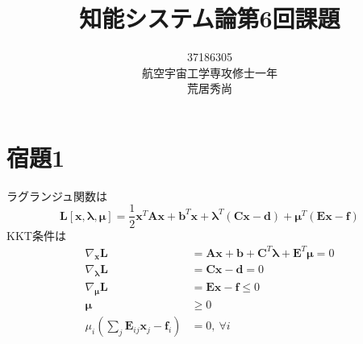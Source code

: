 \documentclass[10pt,a4paper]{ltjsarticle}       %
\title{知能システム論第6回課題}
\author{37186305\\航空宇宙工学専攻修士一年\\荒居秀尚}
\begin{document}
    \maketitle
    \section{宿題1}
    ラグランジュ関数は
    \begin{equation}
    \bm{L}[\bm{x}, \bm{\lambda}, \bm{\mu}] = \frac{1}{2}\bm{x}^T \bm{A}\bm{x} + \bm{b}^T\bm{x} + \bm{\lambda}^T(\bm{Cx} - \bm{d}) + \bm{\mu}^T(\bm{Ex} - \bm{f})
    \end{equation}
    KKT条件は
    \begin{align}
    \nabla_{\bm{x}} \bm{L} &= \bm{Ax} + \bm{b} + \bm{C}^T\bm{\lambda} + \bm{E}^T\bm{\mu} = 0\\
    \nabla_{\bm{\lambda}}\bm{L} &= \bm{Cx} -\bm{d} = 0 \\
    \nabla_{\bm{\mu}}\bm{L} &= \bm{Ex} - \bm{f} \le 0 \\
    \bm{\mu} &\ge 0 \\
    \mu_i \left( \sum_j\bm{E}_{ij} \bm{x}_j - \bm{f}_i \right) &= 0, ~\forall i
    \end{align}
    
\end{document}
